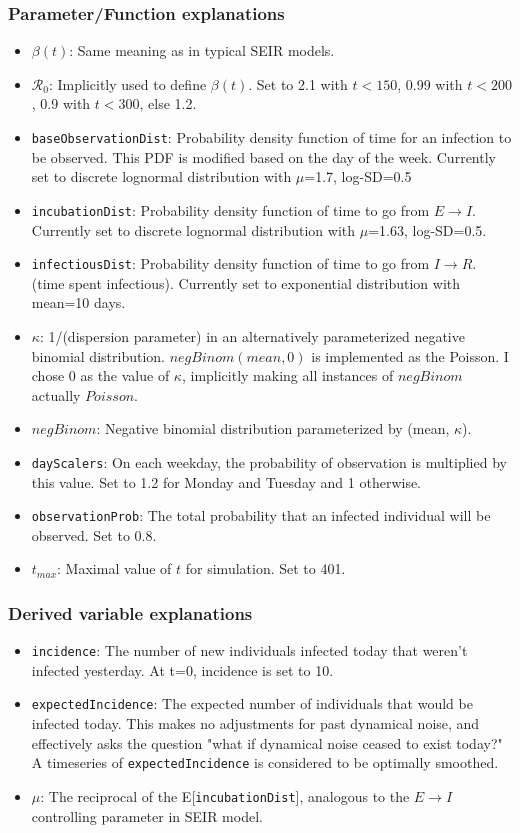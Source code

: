 \documentclass{article}
\newcommand{\nR}{\mathcal{R}}
\newcommand{\code}[1]{\texttt{#1}}
\begin{document}
\subsubsection{Parameter/Function explanations}
\begin{itemize}
    \item $\beta(t)$: Same meaning as in typical SEIR models.
    \item $\nR_0$: Implicitly used to define $\beta(t)$. Set to 2.1 with $t < 150$, 0.99 with $t<200$, 0.9 with $t<300$, else 1.2.
    \item \code{baseObservationDist}: Probability density function of time for an infection to be observed. This PDF is modified based on the day of the week. Currently set to discrete lognormal distribution with $\mu$=1.7, log-SD=0.5 
    \item \code{incubationDist}: Probability density function of time to go from $E \rightarrow I$. Currently set to discrete lognormal distribution with $\mu$=1.63, log-SD=0.5. \cite{McAloon}
    \item \code{infectiousDist}: Probability density function of time to go from $I \rightarrow R$. (time spent infectious). Currently set to exponential distribution with mean=10 days. 
    \item $\kappa$: 1/(dispersion parameter) in an alternatively parameterized negative binomial distribution. \cite{NegBinom} $negBinom(mean, 0)$ is implemented as the Poisson. I chose 0 as the value of $\kappa$, implicitly making all instances of $negBinom$ actually $Poisson$.
    \item $negBinom$: Negative binomial distribution parameterized by (mean, $\kappa$). 
    \item \code{dayScalers}: On each weekday, the probability of observation is multiplied by this value. Set to 1.2 for Monday and Tuesday and 1 otherwise. 
    \item \code{observationProb}: The total probability that an infected individual will be observed. Set to 0.8.
    \item $t_{max}$: Maximal value of $t$ for simulation. Set to 401.
\end{itemize}

\subsubsection{Derived variable explanations}
\begin{itemize}
    \item \code{incidence}: The number of new individuals infected today that weren't infected yesterday. At t=0, incidence is set to 10.
    \item \code{expectedIncidence}: The expected number of individuals that would be infected today. This makes no adjustments for past dynamical noise, and effectively asks the question "what if dynamical noise ceased to exist today?" A timeseries of \code{expectedIncidence} is considered to be optimally smoothed.
    \item $\mu$: The reciprocal of the E[\code{incubationDist}], analogous to the $E \rightarrow I$ controlling parameter in SEIR model.
\end{itemize}
\end{document}
